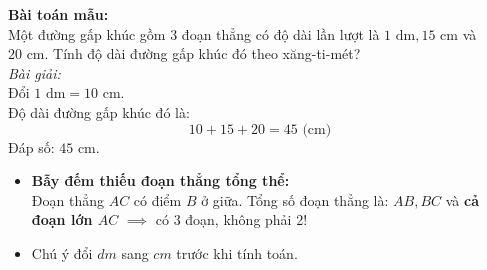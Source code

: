 \documentclass[11pt,a4paper]{article}
\begin{document}
\vspace{-1.5mm}
\noindent
\begin{minipage}[t]{0.49\textwidth}\vspace{0pt}
\begin{tcolorbox}[
  enhanced,
  colback=green!4!white,
  colframe=green!60!black,
  arc=2mm, boxrule=0.8pt,
  left=2mm, right=2mm, top=1.8mm, bottom=1.8mm,
  title={\footnotesize\bfseries\color{white}\faCheckCircle\ 4. Ví dụ thực hành chuẩn mực}
]
{\footnotesize
\textbf{Bài toán mẫu:}\\
Một đường gấp khúc gồm $3$ đoạn thẳng có độ dài lần lượt là $1\text{ dm}, 15\text{ cm}$ và $20\text{ cm}$. Tính độ dài đường gấp khúc đó theo xăng-ti-mét?\\
\textit{Bài giải:}\\
Đổi $1\text{ dm} = 10\text{ cm}$.\\
Độ dài đường gấp khúc đó là:
$$10 + 15 + 20 = 45\text{ (cm)}$$
Đáp số: $45\text{ cm}$.
}
\end{tcolorbox}
\end{minipage}
\hfill
\begin{minipage}[t]{0.49\textwidth}\vspace{0pt}
\begin{tcolorbox}[
  enhanced,
  colback=red!4!white,
  colframe=red!75!black,
  arc=2mm, boxrule=0.8pt,
  left=2mm, right=2mm, top=1.8mm, bottom=1.8mm,
  title={\footnotesize\bfseries\color{white}\faExclamationTriangle\ 5. Mẹo tránh bẫy trắc nghiệm}
]
{\footnotesize
\begin{itemize}\setlength{\itemsep}{1pt}\setlength{\leftskip}{-2.5mm}
  \item \textbf{Bẫy đếm thiếu đoạn thẳng tổng thể:}\\
  Đoạn thẳng $AC$ có điểm $B$ ở giữa. Tổng số đoạn thẳng là: $AB, BC$ và \textbf{cả đoạn lớn $AC$} $\implies$ có $3$ đoạn, không phải 2!
  \item Chú ý đổi $dm$ sang $cm$ trước khi tính toán.
\end{itemize}
}
\end{tcolorbox}
\end{minipage}
\end{document}
